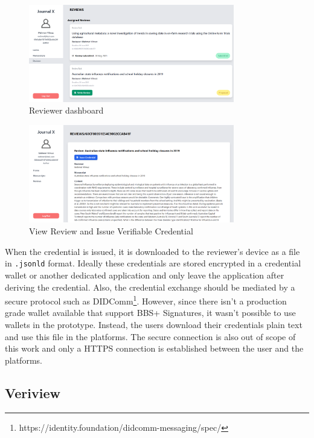 \begin{figure}[htpb]
  \centering
  \includegraphics[width=0.8\textwidth]{figures/reviewerScreen.png}
  \caption{Reviewer dashboard} \label{fig:reviewer-screen}
\end{figure}

\begin{figure}[htpb]
  \centering
  \includegraphics[width=0.8\textwidth]{figures/viewReview.png}
  \caption{View Review and Issue Verifiable Credential} \label{fig:view-review}
\end{figure}

When the credential is issued, it is downloaded to the reviewer's device as a file in \lstinline{.jsonld} format. Ideally these credentials are stored encrypted in a credential wallet or another dedicated application and only leave the application after deriving the credential. Also, the credential exchange should be mediated by a secure protocol such as DIDComm\footnote{https://identity.foundation/didcomm-messaging/spec/}. However, since there isn't a production grade wallet available that support BBS+ Signatures, it wasn't possible to use wallets in the prototype. Instead, the users download their credentials plain text and use this file in the platforms. The secure connection is also out of scope of this work and only a HTTPS connection is established between the user and the platforms.

\subsection{Veriview}

